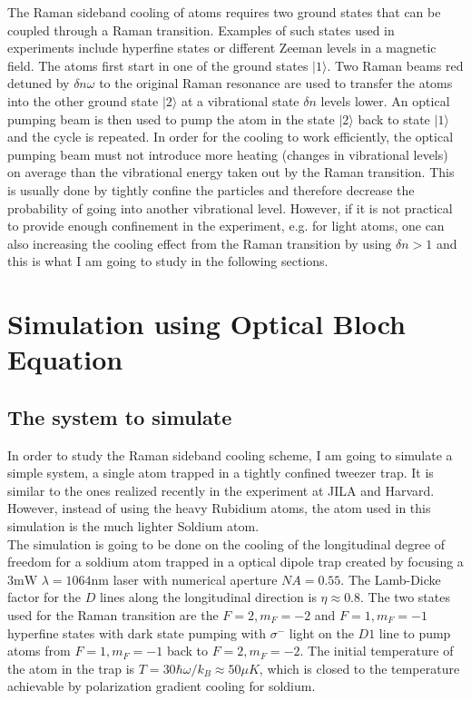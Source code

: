 \documentclass[aps,twocolumn,secnumarabic,balancelastpage,amsmath,amssymb,nofootinbib]{revtex4}
\begin{document}
The Raman sideband cooling of atoms requires two ground states that can be coupled through a Raman transition. Examples of such states used in experiments include hyperfine states or different Zeeman levels in a magnetic field. The atoms first start in one of the ground states $|1\rangle$. Two Raman beams red detuned by $\delta n\omega$ to the original Raman resonance are used to transfer the atoms into the other ground state $|2\rangle$ at a vibrational state $\delta n$ levels lower. An optical pumping beam is then used to pump the atom in the state $|2\rangle$ back to state $|1\rangle$ and the cycle is repeated. In order for the cooling to work efficiently, the optical pumping beam must not introduce more heating (changes in vibrational levels) on average than the vibrational energy taken out by the Raman transition. This is usually done by tightly confine the particles and therefore decrease the probability of going into another vibrational level. However, if it is not practical to provide enough confinement in the experiment, e.g. for light atoms, one can also increasing the cooling effect from the Raman transition by using $\delta n>1$ and this is what I am going to study in the following sections.

\section{Simulation using Optical Bloch Equation}
\subsection{The system to simulate}
In order to study the Raman sideband cooling scheme, I am going to simulate a simple system, a single atom trapped in a tightly confined tweezer trap. It is similar to the ones realized recently in the experiment at JILA\cite{sideband-single-jila} and Harvard\cite{sideband-single-cua}. However, instead of using the heavy Rubidium atoms, the atom used in this simulation is the much lighter Soldium atom.\\

The simulation is going to be done on the cooling of the longitudinal degree of freedom for a soldium atom trapped in a optical dipole trap created by focusing a $3\text{mW}$ $\lambda=1064\text{nm}$ laser with numerical aperture $NA=0.55$. The Lamb-Dicke factor for the $D$ lines along the longitudinal direction is $\eta\approx0.8$. The two states used for the Raman transition are the $F=2, m_F=-2$ and $F=1, m_F=-1$ hyperfine states with dark state pumping with $\sigma^-$ light on the $D1$ line to pump atoms from $F=1, m_F=-1$ back to $F=2, m_F=-2$. The initial temperature of the atom in the trap is $T=30\hbar\omega/k_B\approx50\mu K$, which is closed to the temperature achievable by polarization gradient cooling for soldium.\\
\end{document}

